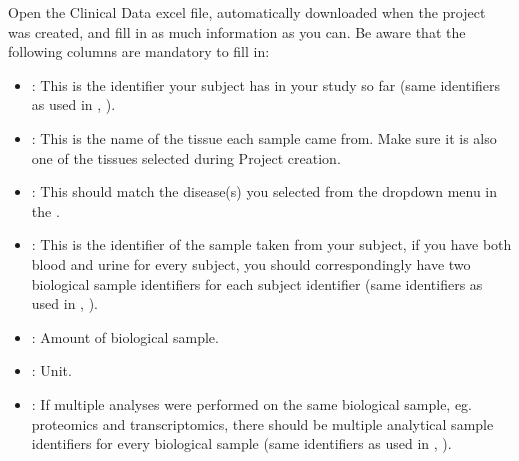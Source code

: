 \documentclass[letterpaper,10pt,english]{sphinxmanual}
\begin{document}
Open the Clinical Data excel file, automatically downloaded when the project was created, and fill in as much information as you can.
Be aware that the following columns are mandatory to fill in:
\begin{itemize}
\item {} 
: This is the identifier your subject has in your study so far (same identifiers as used in {\hyperref[\detokenize{getting_started/upload-data:experimental-design}]{}}, ).

\item {} 
: This is the name of the tissue each sample came from. Make sure it is also one of the tissues selected during Project creation.

\item {} 
: This should match the disease(s) you selected from the drop\sphinxhyphen{}down menu in the {\hyperref[\detokenize{getting_started/create-new-project:project-creation}]{}}.

\item {} 
: This is the identifier of the sample taken from your subject, if you have both blood and urine for every subject, you should correspondingly have two biological sample identifiers for each subject identifier (same identifiers as used in {\hyperref[\detokenize{getting_started/upload-data:experimental-design}]{}}, ).

\item {} 
: Amount of biological sample.

\item {} 
: Unit.

\item {} 
: If multiple analyses were performed on the same biological sample, eg. proteomics and transcriptomics, there should be multiple analytical sample identifiers for every biological sample (same identifiers as used in {\hyperref[\detokenize{getting_started/upload-data:experimental-design}]{}}, ).


\end{itemize}
\end{document}
